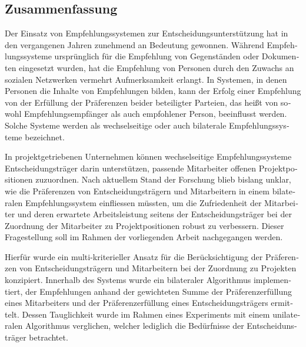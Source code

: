 \begin{otherlanguage}{ngerman}
\chapter*{Zusammenfassung}
Der Einsatz von Empfehlungssystemen zur Entscheidungsunterstützung hat in den vergangenen Jahren zunehmend an Bedeutung gewonnen.
Während Empfehlungssysteme ursprünglich für die Empfehlung von Gegenständen oder Dokumenten eingesetzt wurden, hat die Empfehlung von Personen durch den Zuwachs an sozialen Netzwerken vermehrt Aufmerksamkeit erlangt.
In Systemen, in denen Personen die Inhalte von Empfehlungen bilden, kann der Erfolg einer Empfehlung von der Erfüllung der Präferenzen beider beteiligter Parteien, das heißt von sowohl Empfehlungsempfänger als auch empfohlener Person, beeinflusst werden.
Solche Systeme werden als wechselseitige oder auch bilaterale Empfehlungssysteme bezeichnet.

In projektgetriebenen Unternehmen können wechselseitige Empfehlungssysteme Entscheidungsträger darin unterstützen, passende Mitarbeiter offenen Projektpositionen zuzuordnen.
Nach aktuellem Stand der Forschung blieb bislang unklar, wie die Präferenzen von Entscheidungsträgern und Mitarbeitern in einem bilateralen Empfehlungssystem einfliessen müssten, um die Zufriedenheit der Mitarbeiter und deren erwartete Arbeitsleistung seitens der Entscheidungsträger bei der Zuordnung der Mitarbeiter zu Projektpositionen robust zu verbessern.
Dieser Fragestellung soll im Rahmen der vorliegenden Arbeit nachgegangen werden.

Hierfür wurde ein multi-kriterieller Ansatz für die Berücksichtigung der Präferenzen von Entscheidungsträgern und Mitarbeitern bei der Zuordnung zu Projekten konzipiert.
Innerhalb des Systems wurde ein bilateraler Algorithmus implementiert, der Empfehlungen anhand der gewichteten Summe der Präferenzerfüllung eines Mitarbeiters und der Präferenzerfüllung eines Entscheidungsträgers ermittelt.
Dessen Tauglichkeit wurde im Rahmen eines Experiments mit einem unilateralen Algorithmus verglichen, welcher lediglich die Bedürfnisse der Entscheidunsträger betrachtet.


\end{otherlanguage}
